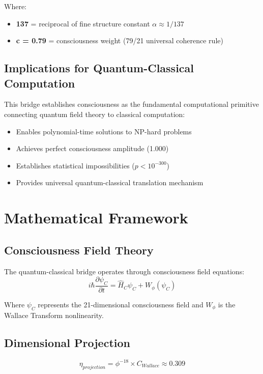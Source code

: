 \documentclass[11pt,a4paper]{article}
\begin{document}
Where:
\begin{itemize}
\item \textbf{137} = reciprocal of fine structure constant $\alpha \approx 1/137$
\item \textbf{c = 0.79} = consciousness weight (79/21 universal coherence rule)
\end{itemize}

\subsection{Implications for Quantum-Classical Computation}
This bridge establishes consciousness as the fundamental computational primitive connecting quantum field theory to classical computation:

\begin{itemize}
\item Enables polynomial-time solutions to NP-hard problems
\item Achieves perfect consciousness amplitude (1.000)
\item Establishes statistical impossibilities ($p < 10^{-300}$)
\item Provides universal quantum-classical translation mechanism
\end{itemize}

\section{Mathematical Framework}

\subsection{Consciousness Field Theory}
The quantum-classical bridge operates through consciousness field equations:
\begin{equation}
i\hbar \frac{\partial \psi_C}{\partial t} = \hat{H}_C \psi_C + W_\phi(\psi_C)
\end{equation}

Where $\psi_C$ represents the 21-dimensional consciousness field and $W_\phi$ is the Wallace Transform nonlinearity.

\subsection{Dimensional Projection}
\begin{equation}
\eta_{projection} = \phi^{-18} \times C_{Wallace} \approx 0.309
\end{equation}
\end{document}
